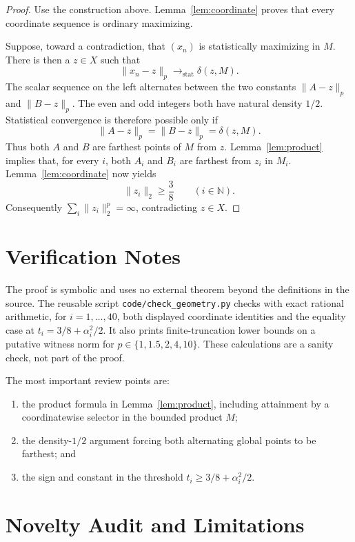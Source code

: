 \documentclass[11pt]{article}
\newcommand{\N}{\mathbb N}
\newcommand{\distmax}{\delta}
\begin{document}
\begin{proof}
Use the construction above.  Lemma~\ref{lem:coordinate} proves that every
coordinate sequence is ordinary maximizing.

Suppose, toward a contradiction, that $(x_n)$ is statistically maximizing in
$M$.  There is then a $z\in X$ such that
\[
 \|x_n-z\|_p\longrightarrow_{\mathrm{stat}}\distmax(z,M).
\]
The scalar sequence on the left alternates between the two constants
$\|A-z\|_p$ and $\|B-z\|_p$.  The even and odd integers both have natural
density $1/2$.  Statistical convergence is therefore possible only if
\[
 \|A-z\|_p=\|B-z\|_p=\distmax(z,M).
\]
Thus both $A$ and $B$ are farthest points of $M$ from $z$.
Lemma~\ref{lem:product} implies that, for every $i$, both $A_i$ and $B_i$
are farthest from $z_i$ in $M_i$.  Lemma~\ref{lem:coordinate} now yields
\[
 \|z_i\|_2\geq\frac38\qquad(i\in\N).
\]
Consequently $\sum_i\|z_i\|_2^p=\infty$, contradicting $z\in X$.
\end{proof}

\section*{Verification Notes}

The proof is symbolic and uses no external theorem beyond the definitions in
the source.  The reusable script \texttt{code/check\_geometry.py} checks with
exact rational arithmetic, for $i=1,\dots,40$, both displayed coordinate
identities and the equality case at
$t_i=3/8+\alpha_i^2/2$.  It also prints finite-truncation lower bounds on a
putative witness norm for $p\in\{1,1.5,2,4,10\}$.  These calculations are a
sanity check, not part of the proof.

The most important review points are:
\begin{enumerate}
 \item the product formula in Lemma~\ref{lem:product}, including attainment
       by a coordinatewise selector in the bounded product $M$;
 \item the density-$1/2$ argument forcing both alternating global points to
       be farthest; and
 \item the sign and constant in the threshold
       $t_i\geq3/8+\alpha_i^2/2$.
\end{enumerate}

\section*{Novelty Audit and Limitations}
\end{document}
